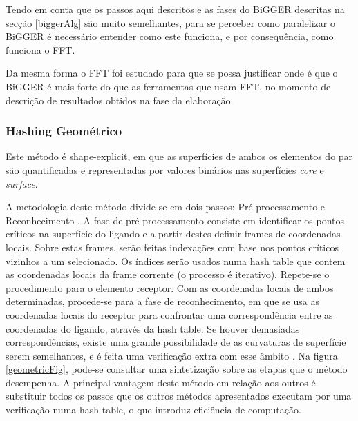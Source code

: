 Tendo em conta que os passos aqui descritos e as fases do BiGGER descritas na secção \ref{biggerAlg} são muito semelhantes, para se perceber como paralelizar o BiGGER é necessário entender como este funciona, e por consequência, como funciona o FFT. 

Da mesma forma o FFT foi estudado para que se possa justificar onde é que o BiGGER é mais forte do que as ferramentas que usam FFT, no momento de descrição de resultados obtidos na fase da elaboração.
 


\subsubsection{Hashing Geométrico }
Este método é shape-explicit, em que as superfícies de ambos os elementos do par são quantificadas e representadas por valores binários nas superfícies \textit{core} e \textit{surface}.

A metodologia deste método divide-se em dois passos: Pré-processamento e Reconhecimento \cite{geometry}.
A fase de pré-processamento consiste em identificar os pontos críticos na superfície do ligando e a partir destes definir frames de coordenadas locais. Sobre estas frames, serão feitas indexações com base nos pontos críticos vizinhos a um selecionado. Os índices serão usados numa hash table que contem as coordenadas locais da frame corrente (o processo é iterativo). Repete-se o procedimento para o elemento receptor. Com as coordenadas locais de ambos determinadas, procede-se para a fase de reconhecimento, em que se usa as coordenadas locais do receptor para confrontar uma correspondência entre as coordenadas do ligando, através da hash table. Se houver demasiadas correspondências, existe uma grande possibilidade de as curvaturas de superfície serem semelhantes, e é feita uma verificação extra com esse âmbito \cite{prediction}. Na figura \ref{geometricFig}, pode-se consultar uma sintetização sobre as etapas que o método desempenha. 
A principal vantagem deste método em relação aos outros é substituir todos os passos que os outros métodos apresentados executam por uma verificação numa hash table, o que introduz eficiência de computação. 

